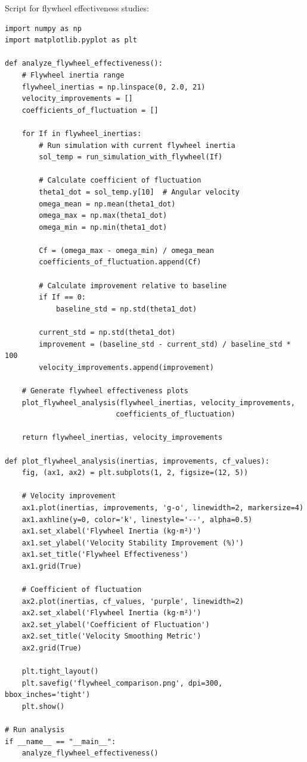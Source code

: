 \documentclass[10pt]{article}
\begin{document}
Script for flywheel effectiveness studies:

\begin{verbatim}
import numpy as np
import matplotlib.pyplot as plt

def analyze_flywheel_effectiveness():
    # Flywheel inertia range
    flywheel_inertias = np.linspace(0, 2.0, 21)
    velocity_improvements = []
    coefficients_of_fluctuation = []
    
    for If in flywheel_inertias:
        # Run simulation with current flywheel inertia
        sol_temp = run_simulation_with_flywheel(If)
        
        # Calculate coefficient of fluctuation
        theta1_dot = sol_temp.y[10]  # Angular velocity
        omega_mean = np.mean(theta1_dot)
        omega_max = np.max(theta1_dot)
        omega_min = np.min(theta1_dot)
        
        Cf = (omega_max - omega_min) / omega_mean
        coefficients_of_fluctuation.append(Cf)
        
        # Calculate improvement relative to baseline
        if If == 0:
            baseline_std = np.std(theta1_dot)
        
        current_std = np.std(theta1_dot)
        improvement = (baseline_std - current_std) / baseline_std * 100
        velocity_improvements.append(improvement)
    
    # Generate flywheel effectiveness plots
    plot_flywheel_analysis(flywheel_inertias, velocity_improvements, 
                          coefficients_of_fluctuation)
    
    return flywheel_inertias, velocity_improvements

def plot_flywheel_analysis(inertias, improvements, cf_values):
    fig, (ax1, ax2) = plt.subplots(1, 2, figsize=(12, 5))
    
    # Velocity improvement
    ax1.plot(inertias, improvements, 'g-o', linewidth=2, markersize=4)
    ax1.axhline(y=0, color='k', linestyle='--', alpha=0.5)
    ax1.set_xlabel('Flywheel Inertia (kg⋅m²)')
    ax1.set_ylabel('Velocity Stability Improvement (%)')
    ax1.set_title('Flywheel Effectiveness')
    ax1.grid(True)
    
    # Coefficient of fluctuation
    ax2.plot(inertias, cf_values, 'purple', linewidth=2)
    ax2.set_xlabel('Flywheel Inertia (kg⋅m²)')
    ax2.set_ylabel('Coefficient of Fluctuation')
    ax2.set_title('Velocity Smoothing Metric')
    ax2.grid(True)
    
    plt.tight_layout()
    plt.savefig('flywheel_comparison.png', dpi=300, bbox_inches='tight')
    plt.show()

# Run analysis
if __name__ == "__main__":
    analyze_flywheel_effectiveness()
\end{verbatim}
\end{document}
